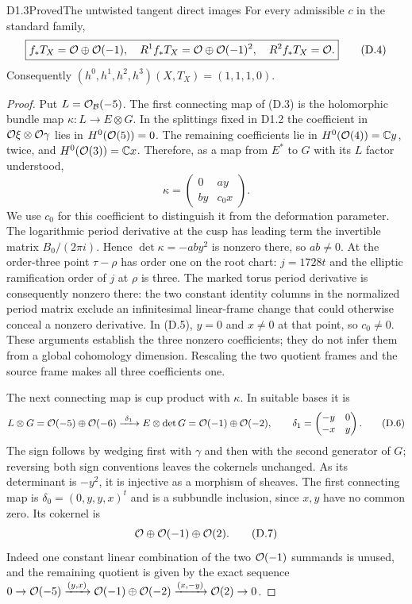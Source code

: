 \begin{claim}{D1.3}{Proved}{The untwisted tangent direct images}
For every admissible $c$ in the standard family,
\[
 \boxed{f_*T_X=\mathcal O\oplus\mathcal O(-1),\quad
 R^1f_*T_X=\mathcal O\oplus\mathcal O(-1)^2,\quad R^2f_*T_X=\mathcal O.}   \tag{D.4}
\]
Consequently $(h^0,h^1,h^2,h^3)(X,T_X)=(1,1,1,0)$.
\end{claim}
\begin{proof}
Put $L=\mathcal O_{\mathcal B}(-5)$. The first connecting map of (D.3) is
the holomorphic bundle map
$\kappa:L\to E\otimes G$. In the splittings fixed in D1.2 the
coefficient in $\mathcal O\xi\otimes\mathcal O\gamma$ lies in $H^0(\mathcal O(5))=0$.
The remaining coefficients lie in
$H^0(\mathcal O(4))=\mathbb C y$, twice, and $H^0(\mathcal O(3))=\mathbb C x$.
Therefore, as a map from $E^*$ to $G$ with its $L$ factor understood,
\[
 \kappa=\begin{pmatrix}0&a y\\ b y&c_0x\end{pmatrix}. \tag{D.5}
\]
We use $c_0$ for this coefficient to distinguish it from the deformation
parameter. The logarithmic period derivative at the cusp has leading
term the invertible matrix $B_0/(2\pi i)$. Hence
$\det\kappa=-ab y^2$ is nonzero there, so $ab\ne0$.
At the order-three point $\tau-\rho$ has order one on the root chart:
$j=1728t$ and the elliptic ramification order of $j$ at $\rho$ is
three. The marked torus period derivative is consequently nonzero
there: the two constant identity columns in the normalized period
matrix exclude an infinitesimal linear-frame change that could
otherwise conceal a nonzero derivative. In (D.5), $y=0$ and
$x\ne0$ at that point, so $c_0\ne0$.
These arguments establish the three nonzero coefficients; they do not
infer them from a global cohomology dimension. Rescaling the two
quotient frames and the source frame makes all three coefficients one.

The next connecting map is cup product with $\kappa$. In suitable
bases it is
\[
 L\otimes G=\mathcal O(-5)\oplus\mathcal O(-6)
 \xrightarrow{\ \delta_1\ }
 E\otimes\det G=\mathcal O(-1)\oplus\mathcal O(-2),\qquad
 \delta_1=\begin{pmatrix}-y&0\\-x&y\end{pmatrix}.       \tag{D.6}
\]
The sign follows by wedging first with $\gamma$ and then with the
second generator of $G$; reversing both sign conventions leaves the
cokernels unchanged. As its determinant is $-y^2$, it is injective as
a morphism of sheaves. The first connecting map is
$\delta_0=(0,y,y,x)^t$ and is a subbundle inclusion, since $x,y$ have
no common zero. Its cokernel is
\[
 \mathcal O\oplus\mathcal O(-1)\oplus\mathcal O(2).                       \tag{D.7}
\]
Indeed one constant linear combination of the two $\mathcal O(-1)$ summands
is unused, and the remaining quotient is given by the exact sequence
$0\to\mathcal O(-5)\xrightarrow{(y,x)}\mathcal O(-1)\oplus\mathcal O(-2)
\xrightarrow{(x,-y)}\mathcal O(2)\to0$.


\end{proof}
